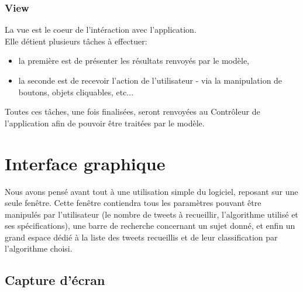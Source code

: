 \documentclass[pdftex,12pt,a4paper]{report}
\begin{document}
\begin{spacing}{1.2}
\subsubsection{View}

La vue est le coeur de l'intéraction avec l'application.
\\
Elle détient plusieurs tâches à effectuer:
\begin{itemize}
\item{la première est de présenter les résultats renvoyés par le modèle,}
\item{la seconde est de recevoir l'action de l'utilisateur - via la manipulation de boutons, objets cliquables, etc...}
\end{itemize}
Toutes ces tâches, une fois finalisées, seront renvoyées au Contrôleur de l'application afin de pouvoir être traitées par le modèle.

\section{Interface graphique}

Nous avons pensé avant tout à une utilisation simple du logiciel, reposant sur une seule fenêtre. Cette fenêtre contiendra tous les paramètres pouvant être manipulés par l'utilisateur (le nombre de tweets à recueillir, l'algorithme utilisé et ses spécifications), une barre de recherche concernant un sujet donné, et enfin un grand espace dédié à la liste des tweets recueillis et de leur classification par l'algorithme choisi.

\subsection{Capture d'écran}


\end{spacing}
\end{document}
